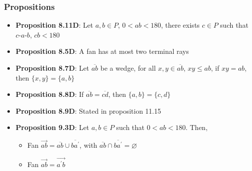 \documentclass{report}
\begin{document}
    \bigbreak \noindent 
    \subsubsection{Propositions}
    \begin{itemize}
        \item \textbf{Proposition 8.11D}: Let $a,b \in P$, $0 < ab < 180$, there exists $c\in P$ such that $ c\text{-}a\text{-}b$, $cb < 180$
        \item \textbf{Proposition 8.5D}: A fan has at most two terminal rays 
        \item \textbf{Proposition 8.7D}: Let $\overline{ab}$ be a wedge, for all $x,y \in \overline{ab}$, $xy \leq ab$, if $xy = ab$, then $\{x,y\} = \{a,b\}$
        \item \textbf{Proposition 8.8D}: If $\overline{ab}  = \overline{cd}$, then $\{a,b\} = \{c,d\}$
        \item \textbf{Proposition 8.9D}: Stated in proposition 11.15
        \item \textbf{Proposition 9.3D}: Let $a,b \in P$ such that $0 < ab < 180$. Then,
            \begin{itemize}
                \item Fan $\overrightarrow{ab} = \overline{ab} \cup \overline{ba^{\prime}}$, with $\overline{ab} \cap \overline{ba^{\prime}}  = \varnothing$
                \item Fan $\overrightarrow{ab} = \overrightarrow{a^{\prime}b} $
            \end{itemize}
    \end{itemize}

    \pagebreak 
\end{document}
